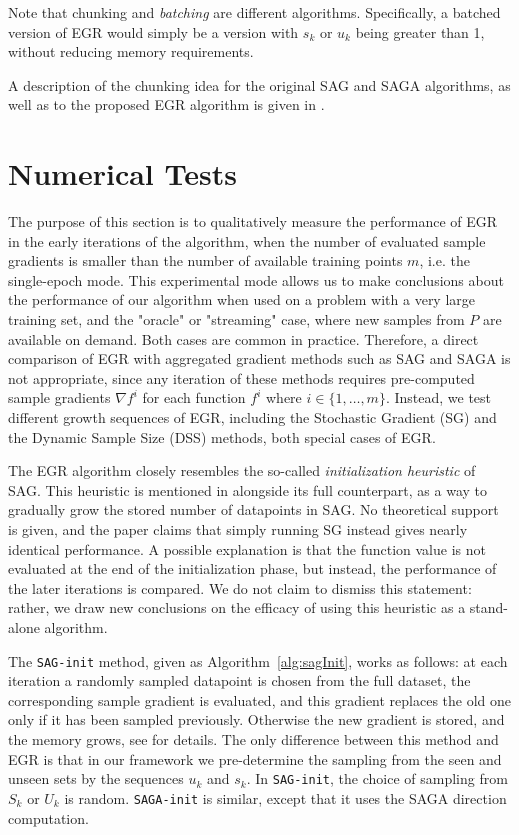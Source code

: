\documentclass[11pt]{article}
\begin{document}
	Note that chunking and \emph{batching} are different algorithms. Specifically, a batched version of EGR would simply be a version with $s_k$ or $u_k$ being greater than 1, without reducing memory requirements. 
	 
A description of the chunking idea for the original SAG and SAGA algorithms, as well as to the proposed EGR algorithm is given in \cite{stefan-thesis}.

\section{Numerical Tests} \label{numerical}
 
 
 The purpose of this section is to qualitatively measure the performance of EGR in the early iterations of the algorithm, when the number of evaluated sample gradients is smaller than the number of available training points $m$, i.e. the single-epoch mode. This experimental mode allows us to make conclusions about the performance of our algorithm when used on a problem with a very large training set, and the "oracle" or "streaming" case,  where new samples from $P$ are available on demand. Both cases are common in practice. Therefore, a direct comparison of EGR with aggregated gradient methods such as SAG and SAGA is not appropriate, since any iteration of these methods requires pre-computed sample gradients $\nabla f^i$ for each function $f^i$ where $i \in  \{1 , \ldots, m \} $. Instead, we test different growth sequences of EGR, including the Stochastic Gradient (SG) and the Dynamic Sample Size (DSS) methods, both special cases of EGR.

 The EGR algorithm closely resembles the so-called \emph{initialization heuristic} of SAG. This heuristic is mentioned in \cite{NIPS2014_5258} alongside its full counterpart, as a way to gradually grow the stored number of datapoints in SAG. No theoretical support is given, and the paper claims that simply running SG instead gives nearly identical performance. A possible explanation is that the function value is not evaluated at the end of the initialization phase, but instead, the performance of the later iterations is compared. We do not claim to dismiss this statement: rather, we draw new conclusions on the efficacy of using this heuristic as a stand-alone algorithm. 
 
 The \texttt{SAG-init} method, given as Algorithm~\ref{alg:sagInit}, works as follows: at each iteration a randomly sampled datapoint is chosen from the full dataset, the corresponding sample gradient is evaluated, and this gradient replaces the old one only if it has been sampled previously. Otherwise the new gradient is stored, and the memory grows, see \cite{roux2012stochastic} for details. The only difference between this method and EGR is that in our framework we pre-determine the sampling from the seen and unseen sets by the sequences $u_k$ and $s_k$. In \texttt{SAG-init}, the choice of sampling from $S_k$ or $U_k$ is random. \texttt{SAGA-init} is similar, except that it uses the SAGA direction computation.
 
\end{document}
